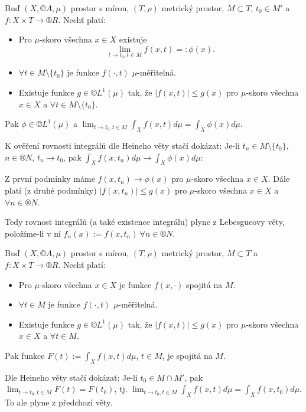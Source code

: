 \documentclass[12pt]{article}					%
\begin{document}
\begin{veta}
	Buď $(X, ©A, \mu)$ prostor s mírou, $(T, \rho)$ metrický prostor, $M \subset T$, $t_0 \in M'$ a $f: X \times T \rightarrow ®R$. Nechť platí:

	\begin{itemize}
		\item Pro $\mu$-skoro všechna $x \in X$ existuje
			$$ \lim_{t \rightarrow t_0, t \in M} f(x, t) =: \phi(x). $$
		\item $\forall t \in M \setminus \{t_0\}$ je funkce $f(·, t)$ $\mu$-měřitelná.
		\item Existuje funkce $g \in ©L^1(\mu)$ tak, že $|f(x, t)| ≤ g(x)$ pro $\mu$-skoro všechna $x \in X$ a $\forall t \in M \setminus \{t_0\}$.
	\end{itemize}

	Pak $\phi \in ©L^1(\mu)$ a $\lim_{t \rightarrow t_0, t \in M} \int_X f(x, t) d\mu = \int_X \phi(x) d\mu$.

	\begin{dukazin}
		K ověření rovnosti integrálů dle Heineho věty stačí dokázat: Je-li $t_n \in M \setminus \{t_0\}$, $n \in ®N$, $t_n \rightarrow t_0$, pak $\int_X f(x, t_n) d\mu \rightarrow \int_X \phi(x) d\mu$:

		Z první podmínky máme $f(x, t_n) \rightarrow \phi(x)$ pro $\mu$-skoro všechna $x \in X$. Dále platí (z druhé podmínky) $|f(x, t_n)| ≤ g(x)$ pro $\mu$-skoro všechna $x \in X$ a $\forall n \in ®N$.

		Tedy rovnost integrálů (a také existence integrálu) plyne z Lebesgueovy věty, položíme-li v ní $f_n(x) := f(x, t_n)\ \forall n \in ®N$.
	\end{dukazin}
\end{veta}

\begin{veta}
	Buď $(X, ©A, \mu)$ prostor s mírou, $(T, \rho)$ metrický prostor, $M \subset T$ a $f: X \times T \rightarrow ®R$. Nechť platí:

	\begin{itemize}
		\item Pro $\mu$-skoro všechna $x \in X$ je funkce $f(x, ·)$ spojitá na $M$.
		\item $\forall t \in M$ je funkce $f(·, t)$ $\mu$-měřitelná.
		\item Existuje funkce $g \in ©L^1(\mu)$ tak, že $|f(x, t)| ≤ g(x)$ pro $\mu$-skoro všechna $x \in X$ a $\forall t \in M$.
	\end{itemize}

	Pak funkce $F(t) := \int_X f(x, t) d\mu$, $t \in M$, je spojitá na $M$.

	\begin{dukazin}
		Dle Heineho věty stačí dokázat: Je-li $t_0 \in M \cap M'$, pak $\lim_{t \rightarrow t_0, t \in M} F(t) = F(t_0)$, tj. $\lim_{t \rightarrow t_0, t \in M} \int_X f(x, t) d\mu = \int_X f(x, t_0) d\mu$. To ale plyne z předchozí věty.
	\end{dukazin}
\end{veta}
\end{document}
